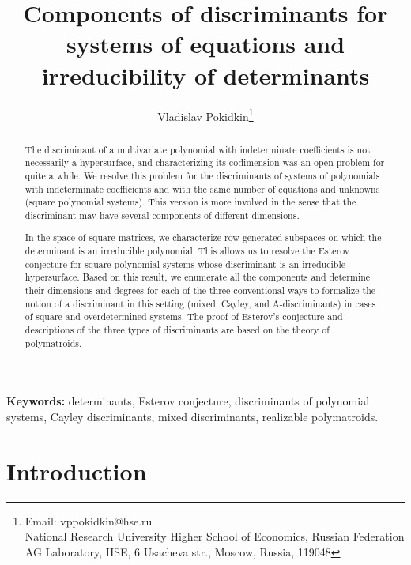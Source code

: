 \documentclass[11pt]{article}
\theoremstyle{plain}
\theoremstyle{definition}
\theoremstyle{remark}
\theoremstyle{plain}
\theoremstyle{plain}
\theoremstyle{plain}
\theoremstyle{definition}
\begin{document}
\title{Components of discriminants for systems of equations and irreducibility
of determinants}
\author{Vladislav Pokidkin\thanks{Email: vppokidkin@hse.ru\protect \\
National Research University Higher School of Economics, Russian Federation\protect \\
AG Laboratory, HSE, 6 Usacheva str., Moscow, Russia, 119048}}
\maketitle
\begin{abstract}
The discriminant of a multivariate polynomial with indeterminate coefficients
is not necessarily a hypersurface, and characterizing its codimension
was an open problem for quite a while. We resolve this problem for
the discriminants of systems of polynomials with indeterminate coefficients
and with the same number of equations and unknowns (square polynomial
systems). This version is more involved in the sense that the discriminant
may have several components of different dimensions. 

In the space of square matrices, we characterize row-generated subspaces
on which the determinant is an irreducible polynomial. This allows
us to resolve the Esterov conjecture for square polynomial systems
whose discriminant is an irreducible hypersurface. Based on this result,
we enumerate all the components and determine their dimensions and
degrees for each of the three conventional ways to formalize the notion
of a discriminant in this setting (mixed, Cayley, and A-discriminants)
in cases of square and overdetermined systems. The proof of Esterov's
conjecture and descriptions of the three types of discriminants are
based on the theory of polymatroids.
\end{abstract}
\textbf{Keywords:} determinants, Esterov conjecture, discriminants
of polynomial systems, Cayley discriminants, mixed discriminants,
realizable polymatroids.

\section{Introduction}
\end{document}
